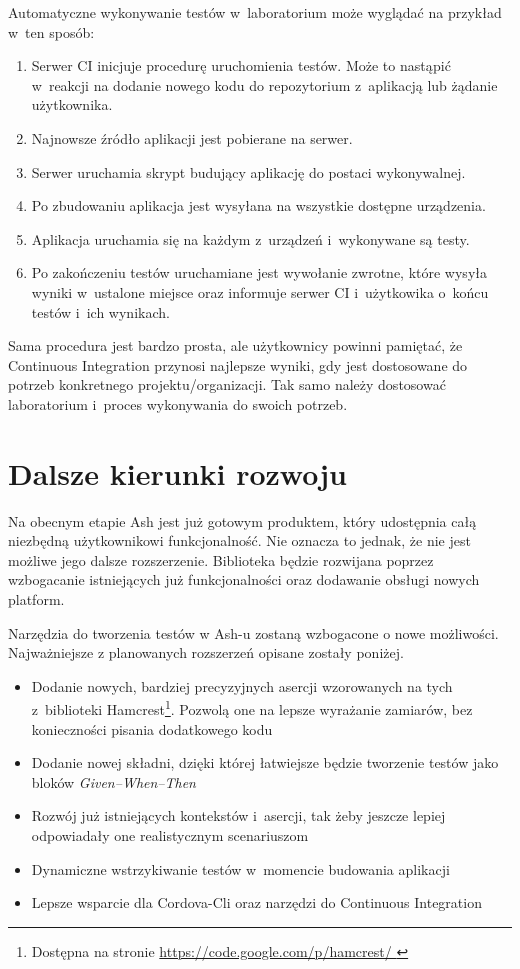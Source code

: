 \documentclass{xmgr}
\begin{document}
Automatyczne wykonywanie testów w~laboratorium może wyglądać na przykład w~ten sposób:

\begin{enumerate}
  \item Serwer CI inicjuje procedurę uruchomienia testów. Może to nastąpić w~reakcji na dodanie nowego kodu do repozytorium z~aplikacją lub żądanie użytkownika.
  \item Najnowsze źródło aplikacji jest pobierane na serwer.
  \item Serwer uruchamia skrypt budujący aplikację do postaci wykonywalnej.
  \item Po zbudowaniu aplikacja jest wysyłana na wszystkie dostępne urządzenia.
  \item Aplikacja uruchamia się na każdym z~urządzeń i~wykonywane są testy.
  \item Po zakończeniu testów uruchamiane jest wywołanie zwrotne, które wysyła wyniki w~ustalone miejsce oraz informuje serwer CI i~użytkowika o~końcu testów i~ich wynikach.
\end{enumerate}

Sama procedura jest bardzo prosta, ale użytkownicy powinni pamiętać, że Continuous Integration przynosi najlepsze wyniki, gdy jest dostosowane do potrzeb konkretnego projektu/organizacji. Tak samo należy dostosować laboratorium i~proces wykonywania do swoich potrzeb. 

\chapter{Dalsze kierunki rozwoju}

Na obecnym etapie Ash jest już gotowym produktem, który udostępnia całą niezbędną użytkownikowi funkcjonalność. Nie oznacza to jednak, że nie jest możliwe jego dalsze rozszerzenie. Biblioteka będzie rozwijana poprzez wzbogacanie istniejących już funkcjonalności oraz dodawanie obsługi nowych platform. 

Narzędzia do tworzenia testów w Ash-u zostaną wzbogacone o nowe możliwości. Najważniejsze z planowanych rozszerzeń opisane zostały poniżej.

\begin{itemize}
  \item Dodanie nowych, bardziej precyzyjnych asercji wzorowanych na tych z~biblioteki Hamcrest\footnote{Dostępna na stronie \url{https://code.google.com/p/hamcrest/ } }. Pozwolą one na lepsze wyrażanie zamiarów, bez konieczności pisania dodatkowego kodu
  \item Dodanie nowej składni, dzięki której łatwiejsze będzie tworzenie testów jako bloków \textit{Given--When--Then}
  \item Rozwój już istniejących kontekstów i~asercji, tak żeby jeszcze lepiej odpowiadały one realistycznym scenariuszom 
  \item Dynamiczne wstrzykiwanie testów w~momencie budowania aplikacji
  \item Lepsze wsparcie dla Cordova-Cli oraz narzędzi do Continuous Integration
\end{itemize}
\end{document}
